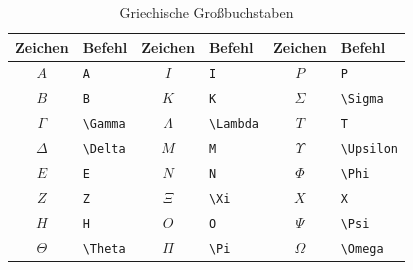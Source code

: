 \documentclass[a4paper,10pt,twoside]{scrbook}
\begin{document}
{\begin{table}[h!tb]
\centering
\caption{Griechische Großbuchstaben}
\label{Tabelle_Griechische_Buchstaben1}       %
\begin{tabular}{clclcl}
\hline
Zeichen & Befehl & Zeichen & Befehl & Zeichen & Befehl \\
\hline
\(A\)      & \texttt{A}                    & \(I\)       & \texttt{I}                     & \(P\)        & \texttt{P}\\
\(B\)      & \texttt{B}                    & \(K\)       & \texttt{K}                     & \(\Sigma\)   & \texttt{\textbackslash Sigma} \\
\(\Gamma\) & \texttt{\textbackslash Gamma} & \(\Lambda\) & \texttt{\textbackslash Lambda} & \(T\)        & \texttt{T}\\
\(\Delta\) & \texttt{\textbackslash Delta} & \(M\)       & \texttt{M}                     & \(\Upsilon\) & \texttt{\textbackslash Upsilon} \\
\(E\)      & \texttt{E}                    & \(N\)       & \texttt{N}                     & \(\Phi\)     & \texttt{\textbackslash Phi}\\
\(Z\)      & \texttt{Z}                    & \(\Xi\)     & \texttt{\textbackslash Xi}     & \(X\)        & \texttt{X}\\
\(H\)      & \texttt{H}                    & \(O\)       & \texttt{O}                     & \(\Psi\)     & \texttt{\textbackslash Psi}\\
\(\Theta\) & \texttt{\textbackslash Theta} & \(\Pi\)     & \texttt{\textbackslash Pi}     & \(\Omega\)   & \texttt{\textbackslash Omega} \\
\hline
\end{tabular}
\end{table}

}
\end{document}
